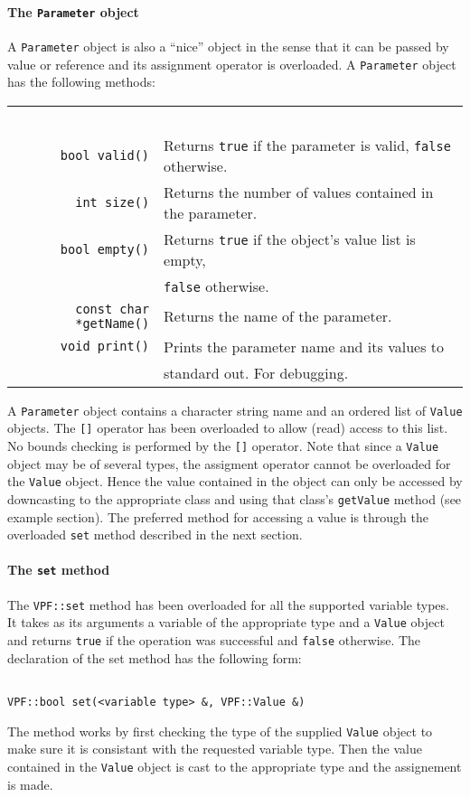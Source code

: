 \documentclass{article}
\newcommand{\code}[1]{\texttt{#1}}
\begin{document}
\paragraph{The \code{Parameter} object}
A \code{Parameter} object is also a ``nice'' object in the sense that it can be 
passed by value or reference and its assignment operator is overloaded.
A \code{Parameter} object has the following methods:

\begin{tabular}[c]{rl}
\ \\
\code{bool valid()} & Returns \code{true} if the parameter is valid, 
\code{false} otherwise.\\
\code{int size()} & Returns the number of values contained in the parameter.\\
\code{bool empty()} & Returns \code{true} if the object's value list is empty,\\ &
 \code{false} otherwise.\\
\code{const char *getName()} & Returns the name of the parameter.\\
\code{void print()} & Prints the parameter name and its values to\\& standard out.  
For debugging.
\ \\
\end{tabular}
\newline

A \code{Parameter} object contains a character string name and an ordered list of 
\code{Value} objects.  The \code{[]} operator has been overloaded to allow (read) 
access to this list. No bounds checking is performed by the \code{[]} operator.
Note that since a \code{Value} object may be of several types, the assigment 
operator cannot be overloaded for the \code{Value} object.  Hence the value 
contained in the object can only be accessed by downcasting to the appropriate
class and using that class's \code{getValue} method (see example section).  The
preferred method for accessing a value is through the overloaded \code{set} method
described in the next section.


\paragraph{The \code{set} method}
The \code{VPF::set} method has been overloaded for all the supported variable types.
It takes as its arguments a variable of the appropriate type and a \code{Value}
object and returns \code{true} if the operation was successful and \code{false}
otherwise.  The declaration of the set method has the following form:
\begin{verbatim}

VPF::bool set(<variable type> &, VPF::Value &)

\end{verbatim}
The method works by first checking the type of the supplied 
\code{Value} object to make sure it is consistant with the requested variable
type.  Then the value contained in the \code{Value} object is cast to the
appropriate type and the assignement is made.
\end{document}
